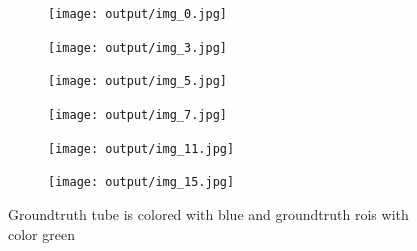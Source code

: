\begin{figure}[h]
  \centering
  \begin{subfigure}{0.15\textwidth}
    \texttt{[image: output/img\_0.jpg]}
  \end{subfigure}
  \begin{subfigure}{0.15\textwidth}
    \texttt{[image: output/img\_3.jpg]}
  \end{subfigure}
  \begin{subfigure}{0.15\textwidth}
    \texttt{[image: output/img\_5.jpg]}
  \end{subfigure}
  \begin{subfigure}{0.15\textwidth}
    \texttt{[image: output/img\_7.jpg]}
  \end{subfigure}
  \begin{subfigure}{0.15\textwidth}
    \texttt{[image: output/img\_11.jpg]}
  \end{subfigure}
  \begin{subfigure}{0.15\textwidth}
    \texttt{[image: output/img\_15.jpg]}
  \end{subfigure}
  
  \caption{\en Groundtruth tube is colored with blue and groundtruth rois with color green}
  \label{fig:gr_gt_tubes_and_rois}
\end{figure}


